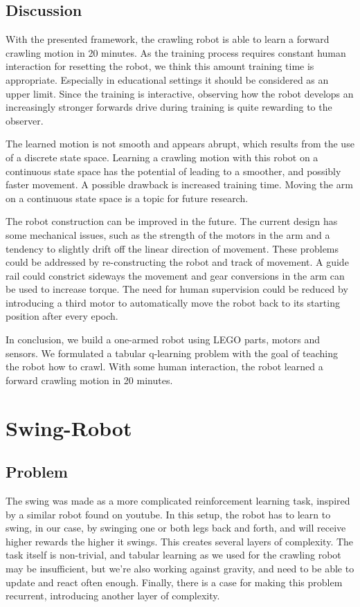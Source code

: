 \documentclass[11pt, a4paper]{article}
\begin{document}
\subsection{Discussion}
With the presented framework, the crawling robot is able to learn a forward crawling motion in 20 minutes. As the training process requires constant human interaction for resetting the robot, we think this amount training time is appropriate. Especially in educational settings it should be considered as an upper limit. Since the training is interactive, observing how the robot develops an increasingly stronger forwards drive during training is quite rewarding to the observer. 

The learned motion is not smooth and appears abrupt, which results from the use of a discrete state space. Learning a crawling motion with this robot on a continuous state space has the potential of leading to a smoother, and possibly faster movement. A possible drawback is increased training time. Moving the arm on a continuous state space is a topic for future research.

The robot construction can be improved in the future. The current design has some mechanical issues, such as the strength of the motors in the arm and a tendency to slightly drift off the linear direction of movement. These problems could be addressed by re-constructing the robot and track of movement. A guide rail could constrict sideways the movement and gear conversions in the arm can be used to increase torque. The need for human supervision could be reduced by introducing a third motor to automatically move the robot back to its starting position after every epoch.

\medskip
In conclusion, we build a one-armed robot using LEGO parts, motors and sensors. We formulated a tabular q-learning problem with the goal of teaching the robot how to crawl. With some human interaction, the robot learned a forward crawling motion in 20 minutes. 




\pagebreak
\section{Swing-Robot}
\subsection{Problem}
The swing was made as a more complicated reinforcement learning task, inspired by a similar robot found on youtube\cite{youtube_swing}. In this setup, the robot has to learn to swing, in our case, by swinging one or both legs back and forth, and will receive higher rewards the higher it swings. This creates several layers of complexity. The task itself is non-trivial, and tabular learning as we used for the crawling robot may be insufficient, but we're also working against gravity, and need to be able to update and react often enough. Finally, there is a case for making this problem recurrent, introducing another layer of complexity.
\end{document}
